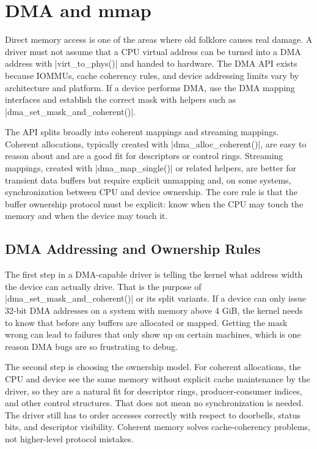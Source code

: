 \documentclass[10pt, oneside]{book}
\begin{document}
\section{DMA and mmap}
\label{sec:dma_mmap}
Direct memory access is one of the areas where old folklore causes real damage.
A driver must not assume that a CPU virtual address can be turned into a DMA
address with \cpp|virt_to_phys()| and handed to hardware.
The DMA API exists because IOMMUs, cache coherency rules, and device addressing
limits vary by architecture and platform.
If a device performs DMA, use the DMA mapping interfaces and establish the
correct mask with helpers such as \cpp|dma_set_mask_and_coherent()|.

The API splits broadly into coherent mappings and streaming mappings.
Coherent allocations, typically created with \cpp|dma_alloc_coherent()|, are
easy to reason about and are a good fit for descriptors or control rings.
Streaming mappings, created with \cpp|dma_map_single()| or related helpers, are
better for transient data buffers but require explicit unmapping and, on some
systems, synchronization between CPU and device ownership.
The core rule is that the buffer ownership protocol must be explicit: know when
the CPU may touch the memory and when the device may touch it.

\subsection{DMA Addressing and Ownership Rules}
\label{sec:dma_rules}
The first step in a DMA-capable driver is telling the kernel what address width
the device can actually drive.
That is the purpose of \cpp|dma_set_mask_and_coherent()| or its split variants.
If a device can only issue 32-bit DMA addresses on a system with memory above
4 GiB, the kernel needs to know that before any buffers are allocated or mapped.
Getting the mask wrong can lead to failures that only show up on certain
machines, which is one reason DMA bugs are so frustrating to debug.

The second step is choosing the ownership model.
For coherent allocations, the CPU and device see the same memory without
explicit cache maintenance by the driver, so they are a natural fit for
descriptor rings, producer-consumer indices, and other control structures.
That does not mean no synchronization is needed.
The driver still has to order accesses correctly with respect to doorbells,
status bits, and descriptor visibility.
Coherent memory solves cache-coherency problems, not higher-level protocol
mistakes.
\end{document}
